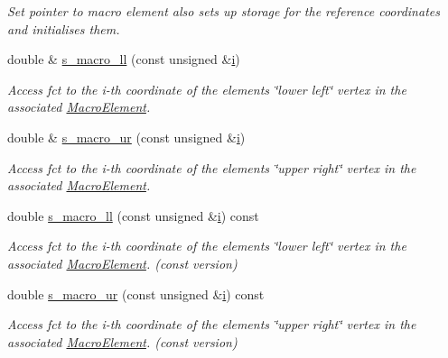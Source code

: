 \begin{DoxyCompactItemize}
\begin{DoxyCompactList}\small\item\em Set pointer to macro element also sets up storage for the reference coordinates and initialises them. \end{DoxyCompactList}\item 
double \& \hyperlink{classoomph_1_1QElementBase_a788011c6b64ed0c6e314b7a1f3165687}{s\+\_\+macro\+\_\+ll} (const unsigned \&\hyperlink{cfortran_8h_adb50e893b86b3e55e751a42eab3cba82}{i})
\begin{DoxyCompactList}\small\item\em Access fct to the i-\/th coordinate of the element\textquotesingle{}s \char`\"{}lower left\char`\"{} vertex in the associated \hyperlink{classoomph_1_1MacroElement}{Macro\+Element}. \end{DoxyCompactList}\item 
double \& \hyperlink{classoomph_1_1QElementBase_aec37122110d976a88d60a061262592a2}{s\+\_\+macro\+\_\+ur} (const unsigned \&\hyperlink{cfortran_8h_adb50e893b86b3e55e751a42eab3cba82}{i})
\begin{DoxyCompactList}\small\item\em Access fct to the i-\/th coordinate of the element\textquotesingle{}s \char`\"{}upper right\char`\"{} vertex in the associated \hyperlink{classoomph_1_1MacroElement}{Macro\+Element}. \end{DoxyCompactList}\item 
double \hyperlink{classoomph_1_1QElementBase_aa7fb5176489dad1bc9ab6cb21f1ede5f}{s\+\_\+macro\+\_\+ll} (const unsigned \&\hyperlink{cfortran_8h_adb50e893b86b3e55e751a42eab3cba82}{i}) const
\begin{DoxyCompactList}\small\item\em Access fct to the i-\/th coordinate of the element\textquotesingle{}s \char`\"{}lower left\char`\"{} vertex in the associated \hyperlink{classoomph_1_1MacroElement}{Macro\+Element}. (const version) \end{DoxyCompactList}\item 
double \hyperlink{classoomph_1_1QElementBase_ad761688aa29832c214b439db278625f2}{s\+\_\+macro\+\_\+ur} (const unsigned \&\hyperlink{cfortran_8h_adb50e893b86b3e55e751a42eab3cba82}{i}) const
\begin{DoxyCompactList}\small\item\em Access fct to the i-\/th coordinate of the element\textquotesingle{}s \char`\"{}upper right\char`\"{} vertex in the associated \hyperlink{classoomph_1_1MacroElement}{Macro\+Element}. (const version) \end{DoxyCompactList}\item 

\end{DoxyCompactItemize}
